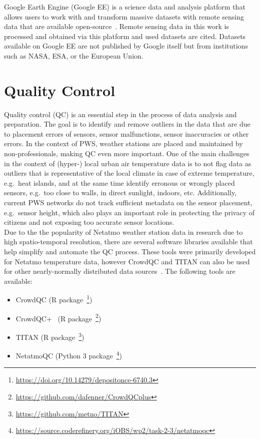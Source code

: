 Google Earth Engine (Google EE) is a science data and analysis platform that allows users to work with and transform massive datasets with remote sensing data that are available open-source~\cite{gorelick2017google}. Remote sensing data in this work is processed and obtained via this platform and used datasets are cited. Datasets available on Google EE are not published by Google itself but from institutions such as NASA, ESA, or the European Union.

\section{Quality Control}
\label{sec:quality control}

Quality control (QC) is an essential step in the process of data analysis and preparation. The goal is to identify and remove outliers in the data that are due to placement errors of sensors, sensor malfunctions, sensor inaccuracies or other errors. In the context of PWS, weather stations are placed and maintained by non-professionals, making QC even more important. One of the main challenges in the context of (hyper-) local urban air temperature data is to not flag data as outliers that is representative of the local climate in case of extreme temperature, e.g.\ heat islands, and at the same time identify erronous or wrongly placed sensors, e.g.\ too close to walls, in direct sunlight, indoors, etc. Additionally, current PWS networks do not track sufficient metadata on the sensor placement, e.g.\ sensor height, which also plays an important role in protecting the privacy of citizens and not exposing too accurate sensor locations.\\
Due to the the popularity of Netatmo weather station data in research due to high spatio-temporal resolution, there are several software libraries available that help simplify and automate the QC process. These tools were primarily developed for Netatmo temperature data, however CrowdQC and TITAN can also be used for other nearly-normally distributed data sources~\cite{hahn2022observations}. The following tools are available:

\begin{itemize}
    \item CrowdQC (R package~\footnote{\url{https://doi.org/10.14279/depositonce-6740.3}})
    \item CrowdQC+~\cite{fenner2021crowdqc+} (R package~\footnote{\url{https://github.com/dafenner/CrowdQCplus}})
    \item TITAN (R package~\footnote{\url{https://github.com/metno/TITAN}})
    \item NetatmoQC (Python 3 package~\footnote{\url{https://source.coderefinery.org/iOBS/wp2/task-2-3/netatmoqc}})
\end{itemize}

